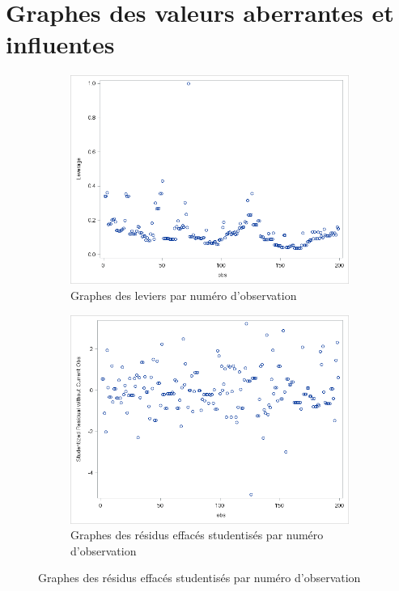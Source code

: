 \documentclass[11pt,a4paper]{article}
\begin{document}
\section{Graphes des valeurs aberrantes et influentes}
\begin{figure}[h]
	\begin{subfigure}{.5\textwidth}
		\centering
		\includegraphics[width=1\linewidth]{leverage}
		\caption{Graphes des leviers par numéro d'observation}
		\label{fig:leverage}
	\end{subfigure}
	\begin{subfigure}{0.5\textwidth}
		\includegraphics[width=1\linewidth]{delstudent}
		\caption{Graphes des résidus effacés studentisés par numéro d'observation}

\end{subfigure}
\end{figure}
\end{document}
